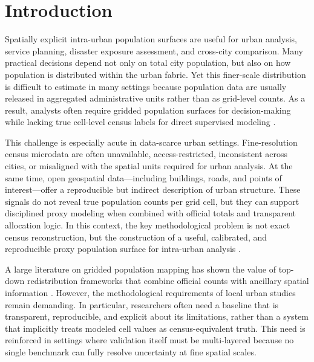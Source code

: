 \section{Introduction}

Spatially explicit intra-urban population surfaces are useful for urban analysis, service planning, disaster exposure assessment, and cross-city comparison. Many practical decisions depend not only on total city population, but also on how population is distributed within the urban fabric. Yet this finer-scale distribution is difficult to estimate in many settings because population data are usually released in aggregated administrative units rather than as grid-level counts. As a result, analysts often require gridded population surfaces for decision-making while lacking true cell-level census labels for direct supervised modeling \cite{Leyk2019,Mennis2009,Stevens2015}.

This challenge is especially acute in data-scarce urban settings. Fine-resolution census microdata are often unavailable, access-restricted, inconsistent across cities, or misaligned with the spatial units required for urban analysis. At the same time, open geospatial data---including buildings, roads, and points of interest---offer a reproducible but indirect description of urban structure. These signals do not reveal true population counts per grid cell, but they can support disciplined proxy modeling when combined with official totals and transparent allocation logic. In this context, the key methodological problem is not exact census reconstruction, but the construction of a useful, calibrated, and reproducible proxy population surface for intra-urban analysis \cite{Leyk2019,WorldPopMethods,GHSL2023}.

A large literature on gridded population mapping has shown the value of top-down redistribution frameworks that combine official counts with ancillary spatial information \cite{Stevens2015,Freire2016,Leyk2019}. However, the methodological requirements of local urban studies remain demanding. In particular, researchers often need a baseline that is transparent, reproducible, and explicit about its limitations, rather than a system that implicitly treats modeled cell values as census-equivalent truth. This need is reinforced in settings where validation itself must be multi-layered because no single benchmark can fully resolve uncertainty at fine spatial scales.

